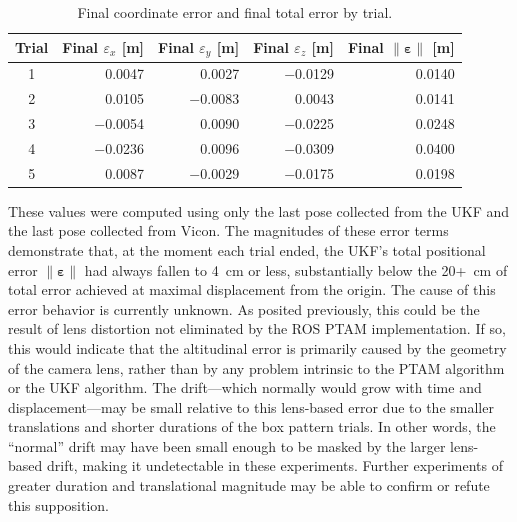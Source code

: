 \begin{table}[h]\centering
\caption[Final Coordinate Error and Final Total Error by Trial]{Final coordinate error and final total error by trial.}
\begin{tabular}[c]{crrrr}
\toprule
Trial & Final $\varepsilon_{x}$ [m] & Final $\varepsilon_{y}$ [m] & Final $\varepsilon_{z}$ [m] & Final $\| \bm{\varepsilon} \|$ [m] \\
\hline
1 & 0.0047 & 0.0027 & $-$0.0129 & 0.0140 \\
2 & 0.0105 & $-$0.0083 & 0.0043 & 0.0141 \\
3 & $-$0.0054 & 0.0090 & $-$0.0225 & 0.0248 \\
4 & $-$0.0236 & 0.0096 & $-$0.0309 & 0.0400 \\
5 & 0.0087 & $-$0.0029 & $-$0.0175 & 0.0198 \\
\bottomrule
\end{tabular}
\label{tab:final_err}
\end{table}

These values were computed using only the last pose collected from the UKF and the last pose collected from Vicon. The magnitudes of these error terms demonstrate that, at the moment each trial ended, the UKF's total positional error $\| \bm{\varepsilon} \|$ had always fallen to 4~cm or less, substantially below the 20+~cm of total error achieved at maximal displacement from the origin. The cause of this error behavior is currently unknown. As posited previously, this could be the result of lens distortion not eliminated by the ROS PTAM implementation. If so, this would indicate that the altitudinal error is primarily caused by the geometry of the camera lens, rather than by any problem intrinsic to the PTAM algorithm or the UKF algorithm. The drift---which normally would grow with time and displacement---may be small relative to this lens-based error due to the smaller translations and shorter durations of the box pattern trials. In other words, the ``normal'' drift may have been small enough to be masked by the larger lens-based drift, making it undetectable in these experiments. Further experiments of greater duration and translational magnitude may be able to confirm or refute this supposition.